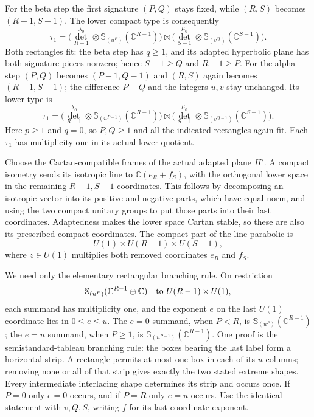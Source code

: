 For the beta step the first signature \((P,Q)\) stays
fixed, while \((R,S)\) becomes \((R-1,S-1)\).
The lower compact type is consequently
\[
 \tau_1=
 \bigl(\det_{R-1}^{\lambda_0}\otimes
                    {\mathbb S}_{(u^P)}(\mathbb C^{R-1})\bigr)
 \boxtimes
 \bigl(\det_{S-1}^{\mu_0}\otimes
                    {\mathbb S}_{(v^Q)}(\mathbb C^{S-1})\bigr).
\]
Both rectangles fit: the beta step has \(q\geq1\),
and its adapted hyperbolic plane has both signature pieces nonzero;
hence \(S-1\geq Q\) and \(R-1\geq P\).
For the alpha step \((P,Q)\) becomes \((P-1,Q-1)\)
and \((R,S)\) again becomes \((R-1,S-1)\);
the difference \(P-Q\) and the integers \(u,v\) stay
unchanged. Its lower type is
\[
 \tau_1=
 \bigl(\det_{R-1}^{\lambda_0}\otimes
                    {\mathbb S}_{(u^{P-1})}
                                             (\mathbb C^{R-1})\bigr)
 \boxtimes
 \bigl(\det_{S-1}^{\mu_0}\otimes
                    {\mathbb S}_{(v^{Q-1})}
                                             (\mathbb C^{S-1})\bigr).
\]
Here \(p\geq1\) and \(q=0\), so \(P,Q\geq1\) and all
the indicated rectangles again fit. Each \(\tau_1\)
has multiplicity one in its actual lower quotient.

Choose the Cartan-compatible frames of the actual adapted
plane \(H'\). A compact isometry sends its isotropic line
to \(\mathbb C(e_R+f_S)\), with the orthogonal lower space
in the remaining \(R-1,S-1\) coordinates. This follows
by decomposing an isotropic vector into its positive
and negative parts, which have equal norm, and using
the two compact unitary groups to put those parts into
their last coordinates. Adaptedness makes the lower
space Cartan stable, so these are also its prescribed
compact coordinates. The compact part of the line
parabolic is
\[
 U(1)\times U(R-1)\times U(S-1),
\]
where \(z\in U(1)\) multiplies both removed coordinates
\(e_R\) and \(f_S\).

We need only the elementary rectangular branching rule.
On restriction
\[
 {\mathbb S}_{(u^P)}(\mathbb C^{R-1}\oplus\mathbb C)
          \quad\hbox{to }U(R-1)\times U(1),
\]
each summand has multiplicity one, and the exponent
\(e\) on the last \(U(1)\) coordinate lies in
\(0\leq e\leq u\). The \(e=0\) summand, when \(P<R\),
is \({\mathbb S}_{(u^P)}(\mathbb C^{R-1})\);
the \(e=u\) summand, when \(P\geq1\), is
\({\mathbb S}_{(u^{P-1})}(\mathbb C^{R-1})\).
One proof is the semistandard-tableau branching rule:
the boxes bearing the last label form a horizontal
strip. A rectangle permits at most one box in each
of its \(u\) columns; removing none or all of that
strip gives exactly the two stated extreme shapes.
Every intermediate interlacing shape determines its
strip and occurs once. If \(P=0\) only \(e=0\)
occurs, and if \(P=R\) only \(e=u\) occurs.
Use the identical statement with \(v,Q,S\), writing
\(f\) for its last-coordinate exponent.

